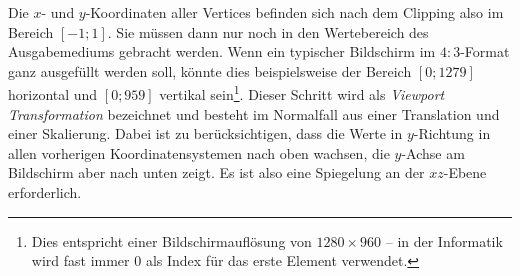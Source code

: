 Die $x$- und $y$-Koordinaten aller Vertices befinden sich nach dem Clipping also im Bereich $\left[ -1; 1 \right]$. Sie müssen dann nur noch in den Wertebereich des Ausgabemediums gebracht werden. Wenn ein typischer Bildschirm im $4:3$-Format ganz ausgefüllt werden soll, könnte dies beispielsweise der Bereich $\left[ 0; 1279 \right]$ horizontal und $\left[ 0; 959 \right]$ vertikal sein\footnote{Dies entspricht einer Bildschirmauflösung von $1280 \times 960$ -- in der Informatik wird fast immer $0$ als Index für das erste Element verwendet.}. Dieser Schritt wird als \emph{Viewport Transformation} bezeichnet und besteht im Normalfall aus einer Translation und einer Skalierung. Dabei ist zu berücksichtigen, dass die Werte in $y$-Richtung in allen vorherigen Koordinatensystemen nach oben wachsen, die $y$-Achse am Bildschirm aber nach unten zeigt. Es ist also eine Spiegelung an der $xz$-Ebene erforderlich.